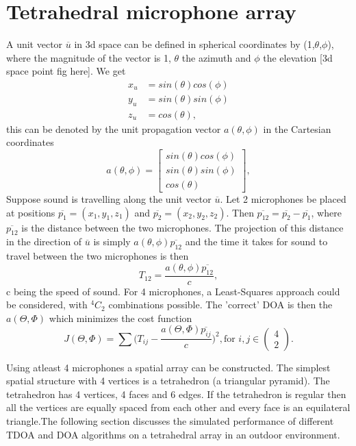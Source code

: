 \section{Tetrahedral microphone array}
A unit vector $\overline{u}$ in 3d space can be defined in spherical coordinates by (1,$\theta$,$\phi$), where the magnitude of the vector is 1, $\theta$ the azimuth and $\phi$ the elevation [3d space point fig here]. We get
\begin{equation}
    \begin{split}
        x_u&=sin(\theta)cos(\phi) \\
        y_u&=sin(\theta)sin(\phi) \\
        z_u&=cos(\theta),
    \end{split}
\end{equation}
this can be denoted by the unit propagation vector ${a(\theta,\phi)}$ in the Cartesian coordinates
\begin{equation}
    a(\theta,\phi)=\begin{bmatrix}sin(\theta)cos(\phi) \\sin(\theta)sin(\phi) \\cos(\theta)\end{bmatrix},
\end{equation}
Suppose sound is travelling along the unit vector $\overline{u}$. Let 2 microphones be placed at positions $\overline{p_1}=(x_1,y_1,z_1)$ and $\overline{p_2}=(x_2,y_2,z_2)$.  Then $\overline{p_{12}}=\overline{p_{2}}-\overline{p_{1}}$, where ${\overline{p_{12}}}$ is the distance between the two microphones. The projection of this distance in the direction of $\overline{u}$ is simply $a(\theta,\phi)\overline{p_{12}}$ and the time it takes for sound to travel between the two microphones is then 
\begin{equation}
    T_{12}=\frac{a(\theta,\phi)\overline{p_{12}}}{c},
\end{equation} c being the speed of sound. For 4 microphones, a Least-Squares approach could be considered, with $^4C_2$ combinations possible. The 'correct' DOA is then the $a(\Theta,\Phi)$ which minimizes the cost function
\begin{equation}
    J(\Theta,\Phi) = \sum\bigg(T_{ij}-\frac{a(\Theta,\Phi)\overline{p_{ij}}}{c}\bigg)^2, \text{for } i,j \in \begin{pmatrix}4\\2\end{pmatrix}.
\end{equation}

Using atleast 4 microphones a spatial array can be constructed. The simplest spatial structure with 4 vertices is a tetrahedron (a triangular pyramid). The tetrahedron has 4 vertices, 4 faces and 6 edges. If the tetrahedron is regular then all the vertices are equally spaced from each other and every face is an equilateral triangle.The following section discusses the simulated performance of different TDOA and DOA algorithms on a tetrahedral array in an outdoor environment.

